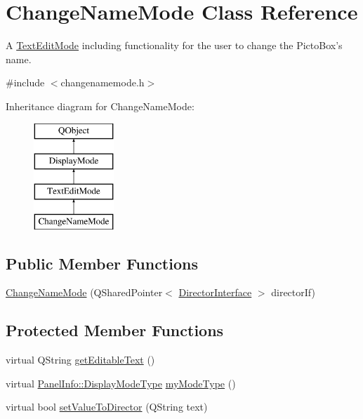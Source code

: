\hypertarget{class_change_name_mode}{\section{Change\-Name\-Mode Class Reference}
\label{class_change_name_mode}
}


A \hyperlink{class_text_edit_mode}{Text\-Edit\-Mode} including functionality for the user to change the Picto\-Box's name.  




{\ttfamily \#include $<$changenamemode.\-h$>$}

Inheritance diagram for Change\-Name\-Mode\-:\begin{figure}[H]
\begin{center}
\leavevmode
\includegraphics[height=4.000000cm]{class_change_name_mode}
\end{center}
\end{figure}
\subsection*{Public Member Functions}
\begin{DoxyCompactItemize}
\item 
\hyperlink{class_change_name_mode_a6f0d597d789143b2f30d09910aa480a4}{Change\-Name\-Mode} (Q\-Shared\-Pointer$<$ \hyperlink{class_director_interface}{Director\-Interface} $>$ director\-If)
\end{DoxyCompactItemize}
\subsection*{Protected Member Functions}
\begin{DoxyCompactItemize}
\item 
virtual Q\-String \hyperlink{class_change_name_mode_a2787e2d47b2d0089c8cf6282d754555c}{get\-Editable\-Text} ()
\item 
virtual \hyperlink{namespace_panel_info_adb8b98e092c15e831aa524d39701d565}{Panel\-Info\-::\-Display\-Mode\-Type} \hyperlink{class_change_name_mode_a6ca753b944fac4847bee38c8b84857d1}{my\-Mode\-Type} ()
\item 
virtual bool \hyperlink{class_change_name_mode_a35cea861e38fde69de934d9ac8feed40}{set\-Value\-To\-Director} (Q\-String text)
\end{DoxyCompactItemize}
